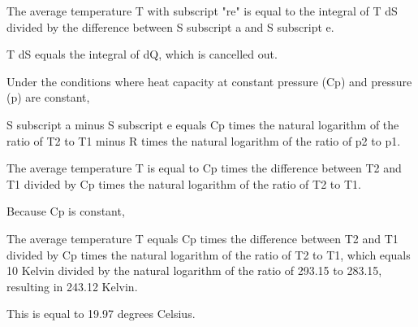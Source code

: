The average temperature T with subscript "re" is equal to the integral of T dS divided by the difference between S subscript a and S subscript e.

T dS equals the integral of dQ, which is cancelled out.

Under the conditions where heat capacity at constant pressure (Cp) and pressure (p) are constant,

S subscript a minus S subscript e equals Cp times the natural logarithm of the ratio of T2 to T1 minus R times the natural logarithm of the ratio of p2 to p1.

The average temperature T is equal to Cp times the difference between T2 and T1 divided by Cp times the natural logarithm of the ratio of T2 to T1.

Because Cp is constant,

The average temperature T equals Cp times the difference between T2 and T1 divided by Cp times the natural logarithm of the ratio of T2 to T1, which equals 10 Kelvin divided by the natural logarithm of the ratio of 293.15 to 283.15, resulting in 243.12 Kelvin.

This is equal to 19.97 degrees Celsius.